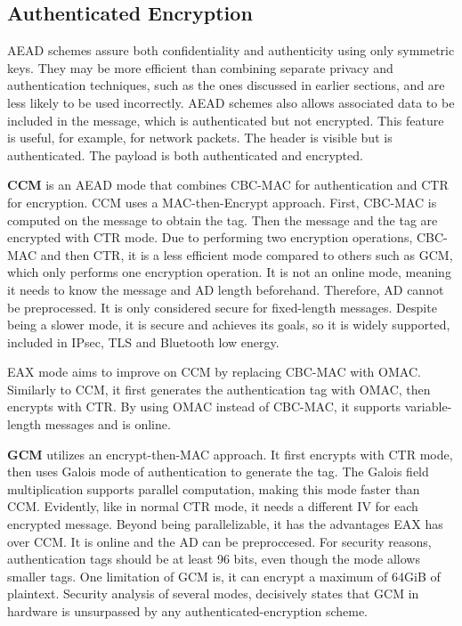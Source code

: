 \subsection{Authenticated Encryption}\label{chap:background:crypto:aead}

 \ac{AEAD} schemes assure both confidentiality and authenticity using only symmetric keys. They may be more efficient than combining separate privacy and authentication techniques, such as the ones discussed in earlier sections, and are less likely to be used incorrectly. \ac{AEAD} schemes also allows associated data to be included in the message, which is authenticated but not encrypted. This feature is useful, for example, for network packets. The header is visible but is authenticated. The payload is both authenticated and encrypted. 

\textbf{\ac{CCM}} is an \ac{AEAD} mode that combines \ac{CBC-MAC} for authentication and \ac{CTR} for encryption.
\ac{CCM} uses a MAC-then-Encrypt approach. First, \ac{CBC-MAC} is computed on the message to obtain the tag. Then the message and the tag are encrypted with \ac{CTR} mode.
Due to performing two encryption operations, \ac{CBC-MAC} and then \ac{CTR}, it is a less efficient mode compared to others such as \ac{GCM}, which only performs one encryption operation.
It is not an online mode, meaning it needs to know the message and \ac{AD} length beforehand. Therefore, \ac{AD} cannot be preprocessed. It is only considered secure for fixed-length messages.
Despite being a slower mode, it is secure and achieves its goals, so it is widely supported, included in \ac{IPsec}, \ac{TLS} and Bluetooth low energy.

\ac{EAX} mode aims to improve on \ac{CCM} by replacing \ac{CBC-MAC} with \ac{OMAC}. Similarly to \ac{CCM}, it first generates the authentication tag with \ac{OMAC}, then encrypts with \ac{CTR}.
By using \ac{OMAC} instead of \ac{CBC-MAC}, it supports variable-length messages and is online.

\textbf{\ac{GCM}} utilizes an encrypt-then-MAC approach. It first encrypts with \ac{CTR} mode, then uses Galois mode of authentication to generate the tag. The Galois field multiplication supports parallel computation, making this mode faster than \ac{CCM}.
Evidently, like in normal \ac{CTR} mode, it needs a different \ac{IV} for each encrypted message.
Beyond being parallelizable, it has the advantages \ac{EAX} has over \ac{CCM}. It is online and the \ac{AD} can be preproccesed.
For security reasons, authentication tags should be at least 96 bits, even though the mode allows smaller tags. One limitation of \ac{GCM} is, it can encrypt a maximum of 64GiB of plaintext. Security analysis of several modes, decisively states that \ac{GCM} in hardware is unsurpassed by any authenticated-encryption scheme.


